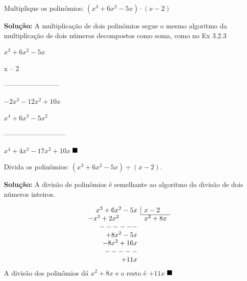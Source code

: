 \begin{texemplo}
Multiplique os polinômios: $(x^3 + 6x^2 - 5x) \cdot (x - 2)$

\textbf{Solução:}
A multiplicação de dois polinômios segue o mesmo algoritmo da multiplicação de dois números decompostos como soma, como no Ex 3.2.3

\hspace{8mm}$x^3 + 6x^2 - 5x$
                
\hspace{23mm}x – 2
		      			 
\hspace{4mm}------------------------
				
\hspace{4mm} $-2x^3 -12x^2  + 10x$
       		       	          
$x^4 +6x^3 -5x^2 $ 
		                
---------------------------

$x^4  +  4x^3  -17x^2  + 10x$ $\qedsymbol$
\end{texemplo}

\begin{texemplo}
Divida os polinômios: $(x^3 + 6x^2 - 5x) \div (x - 2)$.

\textbf{Solução:}
A divisão de polinômios é semelhante ao algoritmo da divisão de dois números inteiros.

\[
\begin{array}{rl}
x^3 + 6x^2 - 5x & \myrule{x-2} \\
\cline{2-2}
-x^3 + 2x^2~~~~~~~~ & x^2  + 8x \\
------\\
+8x^2-5x\\
-8x^2+16x\\
-----\\
+11x
\end{array}
\]
A divisão dos polinômios dá $x^2  + 8x$ e o resto é $+11x$ $\qedsymbol$

\end{texemplo}

